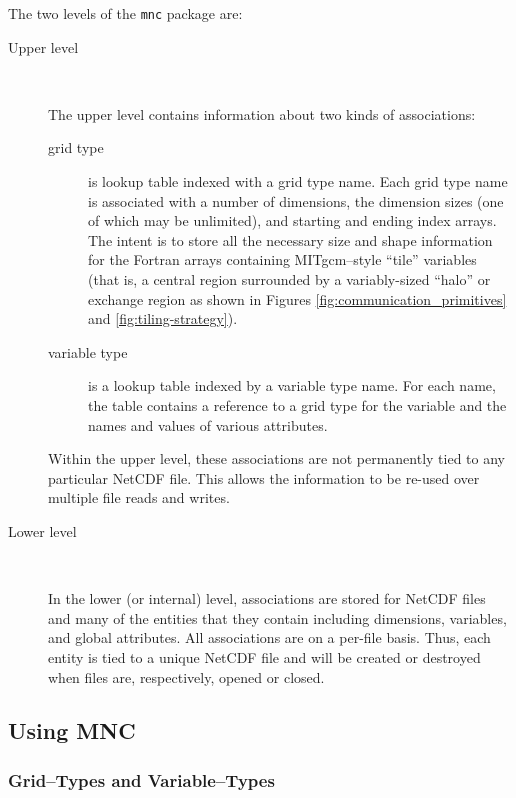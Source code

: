 The two levels of the \texttt{mnc} package are:
\begin{description}

\item[Upper level] \ 
  
  The upper level contains information about two kinds of
  associations:
  \begin{description}
  \item[grid type] is lookup table indexed with a grid type name.
    Each grid type name is associated with a number of dimensions, the
    dimension sizes (one of which may be unlimited), and starting and
    ending index arrays.  The intent is to store all the necessary
    size and shape information for the Fortran arrays containing
    MITgcm--style ``tile'' variables (that is, a central region
    surrounded by a variably-sized ``halo'' or exchange region as
    shown in Figures \ref{fig:communication_primitives} and
    \ref{fig:tiling-strategy}).
  
  \item[variable type] is a lookup table indexed by a variable type
    name.  For each name, the table contains a reference to a grid
    type for the variable and the names and values of various
    attributes.
  \end{description}
  
  Within the upper level, these associations are not permanently tied
  to any particular NetCDF file.  This allows the information to be
  re-used over multiple file reads and writes.

\item[Lower level] \ 
  
  In the lower (or internal) level, associations are stored for NetCDF
  files and many of the entities that they contain including
  dimensions, variables, and global attributes.  All associations are
  on a per-file basis.  Thus, each entity is tied to a unique NetCDF
  file and will be created or destroyed when files are, respectively,
  opened or closed.

\end{description}


\subsection{Using MNC}

\subsubsection{Grid--Types and Variable--Types}

